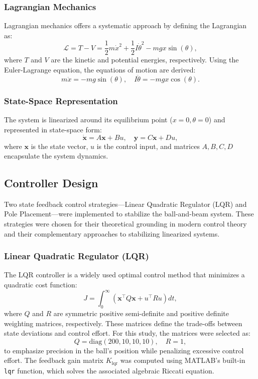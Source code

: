 \documentclass[conference]{IEEEtran}
\begin{document}
\subsubsection{Lagrangian Mechanics}
\label{subsubsec:model_lagrangian}
Lagrangian mechanics offers a systematic approach by defining the Lagrangian as:
\begin{equation}
\mathcal{L} = T - V = \frac{1}{2}m\dot{x}^2 + \frac{1}{2}I\dot{\theta}^2 - m g x \sin(\theta),
\end{equation}
where \(T\) and \(V\) are the kinetic and potential energies, respectively. Using the Euler-Lagrange equation, the equations of motion are derived:
\begin{equation}
m\ddot{x} = -m g \sin(\theta), \quad I\ddot{\theta} = -m g x \cos(\theta).
\end{equation}

\subsubsection{State-Space Representation}
\label{subsubsec:model_ss}
The system is linearized around its equilibrium point (\(x = 0, \theta = 0\)) and represented in state-space form:
\begin{equation}
\dot{\mathbf{x}} = A\mathbf{x} + B u, \quad \mathbf{y} = C\mathbf{x} + D u,
\end{equation}
where \(\mathbf{x}\) is the state vector, \(u\) is the control input, and matrices \(A, B, C, D\) encapsulate the system dynamics.

\subsection{Controller Design}
\label{subsec:controller_design}
Two state feedback control strategies—Linear Quadratic Regulator (LQR) and Pole Placement—were implemented to stabilize the ball-and-beam system. These strategies were chosen for their theoretical grounding in modern control theory and their complementary approaches to stabilizing linearized systems.

\subsubsection{Linear Quadratic Regulator (LQR)}
\label{subsubsec:lqr}
The LQR controller is a widely used optimal control method that minimizes a quadratic cost function:
\begin{equation}
J = \int_{0}^{\infty} (\mathbf{x}^\top Q \mathbf{x} + u^\top R u) dt,
\end{equation}
where \(Q\) and \(R\) are symmetric positive semi-definite and positive definite weighting matrices, respectively. These matrices define the trade-offs between state deviations and control effort. For this study, the matrices were selected as:
\[
Q = \text{diag}(200, 10, 10, 10), \quad R = 1,
\]
to emphasize precision in the ball's position while penalizing excessive control effort. The feedback gain matrix \(K_{\text{lqr}}\) was computed using MATLAB's built-in \texttt{lqr} function, which solves the associated algebraic Riccati equation.
\end{document}
